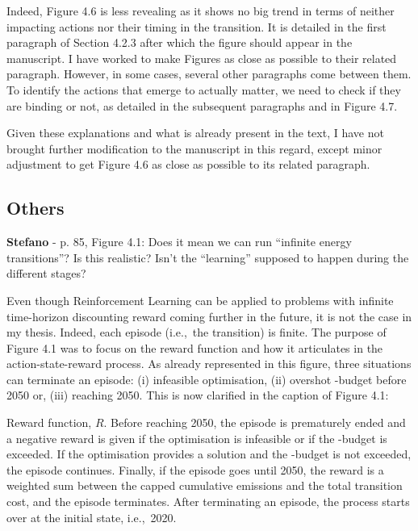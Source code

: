 \documentclass[12pt,a4paper]{article}
\def\ie{i.e.,\ }
\begin{document}
\noindent Indeed, Figure 4.6 is less revealing as it shows no big trend in terms of neither impacting actions nor their timing in the transition.  It is detailed in the first paragraph of Section 4.2.3 after which the figure should appear in the manuscript. I have worked to make Figures as close as possible to their related paragraph. However, in some cases, several other paragraphs come between them. To identify the actions that emerge to actually matter, we need to check if they are binding or not, as detailed in the subsequent paragraphs and in Figure 4.7.

Given these explanations and what is already present in the text, I have not brought further modification to the manuscript in this regard, except minor adjustment to get Figure 4.6 as close as possible to its related paragraph.


\subsection{Others}

\begin{mdframed}[style=comment] %
{\color{orange} \textbf{Stefano}} - p. 85, Figure 4.1: Does it mean we can run ``infinite energy transitions''? Is this realistic? Isn’t the ``learning'' supposed to happen during the different stages?
\end{mdframed}

\noindent Even though Reinforcement Learning can be applied to problems with infinite time-horizon discounting reward coming further in the future, it is not the case in my thesis. Indeed, each episode (\ie the transition) is finite. The purpose of Figure 4.1 was to focus on the reward function and how it articulates in the action-state-reward process. As already represented in this figure, three situations can terminate an episode: (i) infeasible optimisation, (ii) overshot -budget before 2050 or, (iii) reaching 2050. This is now clarified {\color{blue}in the caption of Figure 4.1}:

\begin{mdframed}[style=manuscript] %
Reward function, $R$. Before reaching 2050, the episode is prematurely ended and a negative reward is given if the optimisation is infeasible or if the -budget is exceeded. If the optimisation provides a solution and the -budget is not exceeded, the episode continues. Finally, if the episode goes until 2050, the reward is a weighted sum between the capped cumulative emissions and the total transition cost, and the episode terminates. After terminating an episode, the process starts over at the initial state, \ie 2020.
\end{mdframed}
\end{document}
